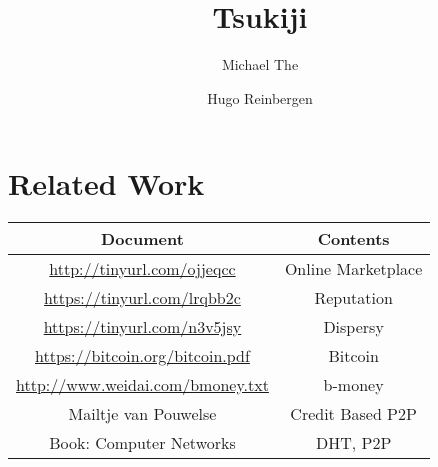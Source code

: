 \documentclass[]{article}
\title{Tsukiji}
\author{Michael The \and Hugo Reinbergen}
\begin{document}
\maketitle

\section*{Related Work}
\begin{tabular}{|c|c|}
 \hline
 Document & Contents  \\
 \hline
 \url{http://tinyurl.com/ojjeqcc} & Online Marketplace \\
 \url{https://tinyurl.com/lrqbb2c} & Reputation \\
 \url{https://tinyurl.com/n3v5jsy} & Dispersy \\
 \url{https://bitcoin.org/bitcoin.pdf} & Bitcoin \\
 \url{http://www.weidai.com/bmoney.txt} & b-money \\
 Mailtje van Pouwelse & Credit Based P2P \\
 Book: Computer Networks & DHT, P2P \\
 \hline
\end{tabular}




\tableofcontents










\begin{appendices}
\newpage

\newpage

\end{appendices}
\end{document}
